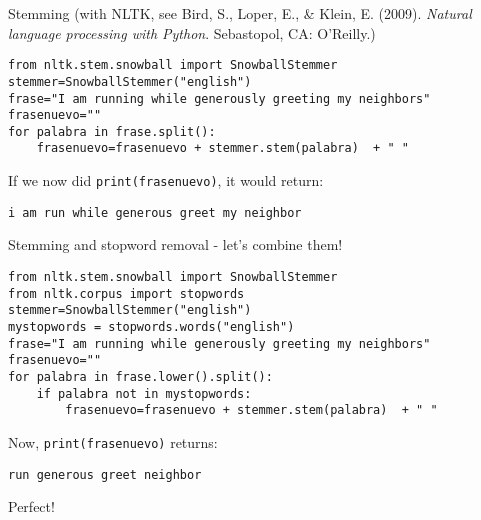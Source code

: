 \documentclass{beamer}
\begin{document}
\begin{frame}[fragile]{Stemming}
{\footnotesize{(with NLTK, see Bird, S., Loper, E., \& Klein, E. (2009). \emph{Natural language processing with Python}. Sebastopol, CA: O’Reilly.)}}
\begin{lstlisting}
from nltk.stem.snowball import SnowballStemmer
stemmer=SnowballStemmer("english")
frase="I am running while generously greeting my neighbors"
frasenuevo=""
for palabra in frase.split():
    frasenuevo=frasenuevo + stemmer.stem(palabra)  + " "
\end{lstlisting}
If we now did {\tt{print(frasenuevo)}}, it would return:
\begin{lstlisting}
i am run while generous greet my neighbor
\end{lstlisting}
\end{frame}

\begin{frame}[fragile]{Stemming and stopword removal - let's combine them!}
\begin{lstlisting}
from nltk.stem.snowball import SnowballStemmer
from nltk.corpus import stopwords
stemmer=SnowballStemmer("english")
mystopwords = stopwords.words("english")
frase="I am running while generously greeting my neighbors"
frasenuevo=""
for palabra in frase.lower().split():
    if palabra not in mystopwords:
        frasenuevo=frasenuevo + stemmer.stem(palabra)  + " "
\end{lstlisting}
Now, {\tt{print(frasenuevo)}} returns:
\begin{lstlisting}
run generous greet neighbor
\end{lstlisting}
Perfect!\\
\end{frame}

{
\begin{frame}[plain]
\end{frame}
}
\end{document}
